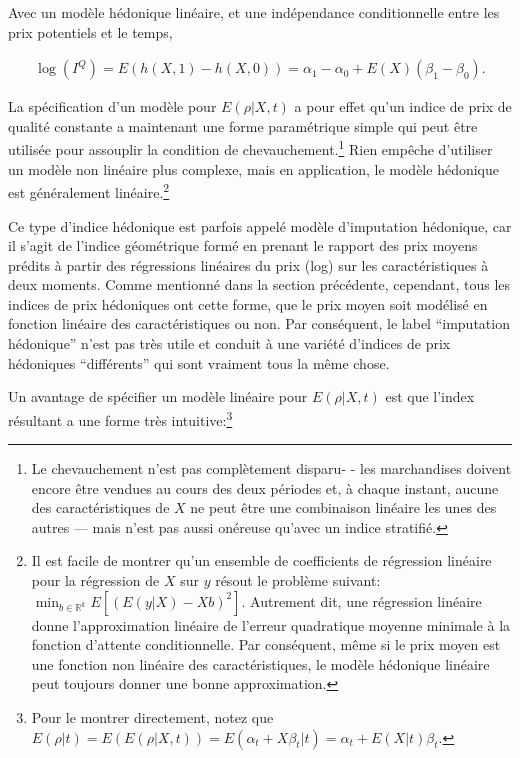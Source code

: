 \documentclass[
]{article}
\begin{document}
Avec un modèle hédonique linéaire, et une indépendance conditionnelle entre les prix potentiels et le temps,

\begin{align*}
\log (I^{Q}) = E(h (X, 1) - h (X, 0)) = \alpha_{1} - \alpha_{0} + E(X) (\beta_{1} - \beta_{0}).
\end{align*}

La spécification d'un modèle pour \(E(\rho | X, t)\) a pour effet qu'un indice de prix de qualité constante a maintenant une forme paramétrique simple qui peut être utilisée pour assouplir la condition de chevauchement.\footnote{Le chevauchement n'est pas complètement disparu- - les marchandises doivent encore être vendues au cours des deux périodes et, à chaque instant, aucune des caractéristiques de \(X\) ne peut être une combinaison linéaire les unes des autres --- mais n'est pas aussi onéreuse qu'avec un indice stratifié.} Rien empêche d'utiliser un modèle non linéaire plus complexe, mais en application, le modèle hédonique est généralement linéaire.\footnote{Il est facile de montrer qu'un ensemble de coefficients de régression linéaire pour la régression de \(X\) sur \(y\) résout le problème suivant: \(\min_{b \in \mathbb {R}^{k}} E[(E(y | X) - Xb)^{2}]\). Autrement dit, une régression linéaire donne l'approximation linéaire de l'erreur quadratique moyenne minimale à la fonction d'attente conditionnelle. Par conséquent, même si le prix moyen est une fonction non linéaire des caractéristiques, le modèle hédonique linéaire peut toujours donner une bonne approximation.}

Ce type d'indice hédonique est parfois appelé modèle d'imputation hédonique, car il s'agit de l'indice géométrique formé en prenant le rapport des prix moyens prédits à partir des régressions linéaires du prix (log) sur les caractéristiques à deux moments. Comme mentionné dans la section précédente, cependant, tous les indices de prix hédoniques ont cette forme, que le prix moyen soit modélisé en fonction linéaire des caractéristiques ou non. Par conséquent, le label ``imputation hédonique'' n'est pas très utile et conduit à une variété d'indices de prix hédoniques ``différents'' qui sont vraiment tous la même chose.

Un avantage de spécifier un modèle linéaire pour \(E(\rho | X, t)\) est que l'index résultant a une forme très intuitive:\footnote{Pour le montrer directement, notez que \(E(\rho | t) = E(E(\rho | X, t)) = E(\alpha_{t} + X \beta_{t} | t) = \alpha_{t} + E(X | t) \beta_{t}\).}
\end{document}
